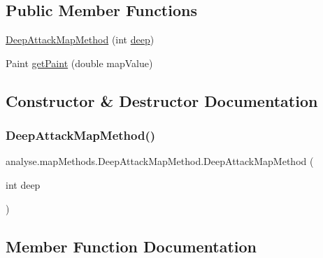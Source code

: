 \subsection*{Public Member Functions}
\begin{DoxyCompactItemize}
\item 
\mbox{\hyperlink{classanalyse_1_1map_methods_1_1_deep_attack_map_method_a358007674dd98c7265efa87914a3545d}{Deep\+Attack\+Map\+Method}} (int \mbox{\hyperlink{classanalyse_1_1map_methods_1_1_abstract_deep_map_method_a90ee3a39a212a9cc99f22913cc8809a5}{deep}})
\item 
Paint \mbox{\hyperlink{classanalyse_1_1map_methods_1_1_deep_attack_map_method_a008dea396873a28b5fb5da7399a2ae07}{get\+Paint}} (double map\+Value)
\end{DoxyCompactItemize}


\subsection{Constructor \& Destructor Documentation}
\mbox{\label{classanalyse_1_1map_methods_1_1_deep_attack_map_method_a358007674dd98c7265efa87914a3545d}} 
\subsubsection{\texorpdfstring{Deep\+Attack\+Map\+Method()}{DeepAttackMapMethod()}}
{\footnotesize\ttfamily analyse.\+map\+Methods.\+Deep\+Attack\+Map\+Method.\+Deep\+Attack\+Map\+Method (\begin{DoxyParamCaption}\item[{int}]{deep }\end{DoxyParamCaption})\hspace{0.3cm}{\ttfamily [inline]}}



\subsection{Member Function Documentation}
\mbox{\label{classanalyse_1_1map_methods_1_1_deep_attack_map_method_a008dea396873a28b5fb5da7399a2ae07}} 
